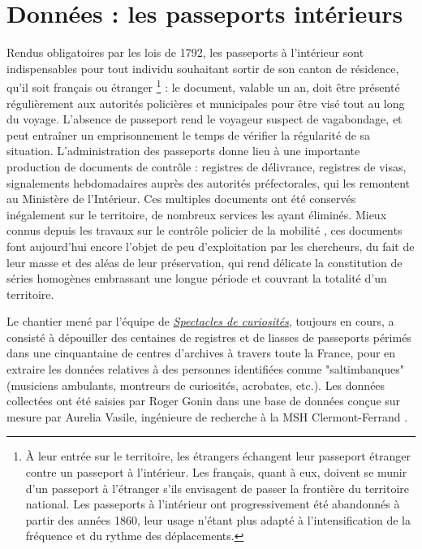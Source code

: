 \documentclass[final, fra]{anthology-ch}     %
\begin{document}
\section{Données : les passeports intérieurs}
Rendus obligatoires par les lois de 1792, les passeports à l’intérieur sont indispensables pour tout individu souhaitant sortir de son canton de résidence, qu'il soit français ou étranger \footnote{À leur entrée sur le territoire, les étrangers échangent leur passeport étranger contre un passeport à l'intérieur. Les français, quant à eux, doivent se munir d'un passeport à l'étranger s'ils envisagent de passer la frontière du territoire national. Les passeports à l'intérieur ont progressivement été abandonnés à partir des années 1860, leur usage n'étant plus adapté à l'intensification de la fréquence et du rythme des déplacements.} : le document, valable un an, doit être présenté régulièrement aux autorités policières et municipales pour être visé tout au long du voyage. L'absence de passeport rend le voyageur suspect de vagabondage, et peut entraîner un emprisonnement le temps de vérifier la régularité de sa situation. L’administration des passeports donne lieu à une importante production de documents de contrôle : registres de délivrance, registres de visas, signalements hebdomadaires auprès des autorités préfectorales, qui les remontent au Ministère de l’Intérieur. Ces multiples documents ont été conservés inégalement sur le territoire, de nombreux services les ayant éliminés. Mieux connus depuis les travaux sur le contrôle policier de la mobilité \cite{denis_contromobilite_2001, denis_histoire_2008, becchia_voyages_1991, noiriel_surveiller_1998}, ces documents font aujourd’hui encore l’objet de peu d’exploitation par les chercheurs, du fait de leur masse et des aléas de leur préservation, qui rend délicate la constitution de séries homogènes embrassant une longue période et couvrant la totalité d'un territoire. 

Le chantier mené par l'équipe de \href{https://spectacle-de-curiosites.msh.uca.fr/}{\textit{Spectacles de curiosités}}, toujours en cours, a consisté à dépouiller des centaines de registres et de liasses de passeports périmés dans une cinquantaine de centres d’archives à travers toute la France, pour en extraire les données relatives à des personnes identifiées comme "saltimbanques" (musiciens ambulants, montreurs de curiosités, acrobates, etc.). Les données collectées ont été saisies par Roger Gonin dans une base de données conçue sur mesure par Aurelia Vasile, ingénieure de recherche à la MSH Clermont-Ferrand \cite{gonin_base_2024}.
\end{document}
